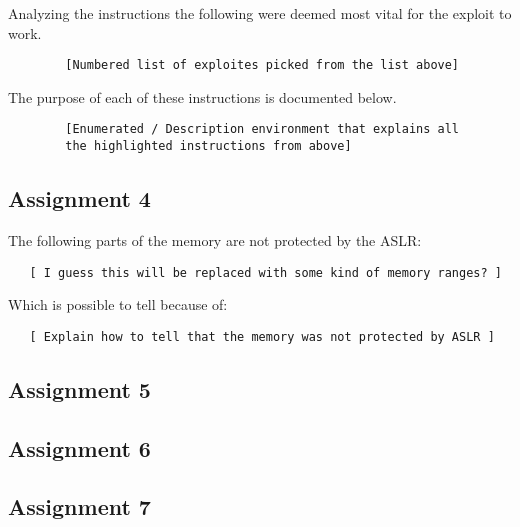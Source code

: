 \documentclass[10pt]{article}
\begin{document}
      Analyzing the instructions the following were deemed most vital for the
      exploit to work.

      \begin{verbatim}
        [Numbered list of exploites picked from the list above]
      \end{verbatim}

      The purpose of each of these instructions is documented below.

      \begin{verbatim}
        [Enumerated / Description environment that explains all
        the highlighted instructions from above]
      \end{verbatim}


    \subsection{Assignment 4}

      The following parts of the memory are not protected by the ASLR:

      \begin{verbatim}
   [ I guess this will be replaced with some kind of memory ranges? ]
      \end{verbatim}

      Which is possible to tell because of:

      \begin{verbatim}
   [ Explain how to tell that the memory was not protected by ASLR ]
      \end{verbatim}

    \subsection{Assignment 5}

    \subsection{Assignment 6}

    \subsection{Assignment 7}
\end{document}
